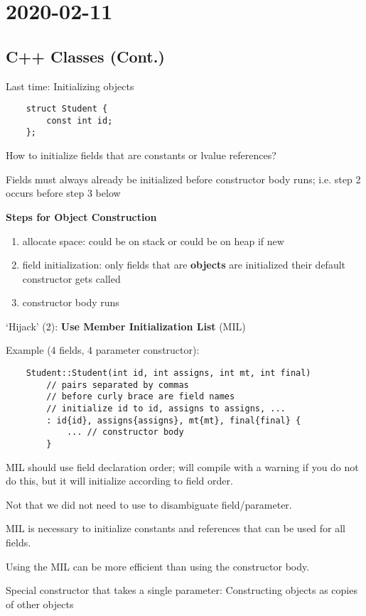 \section{2020-02-11}
\subsection{C++ Classes (Cont.)}
Last time: Initializing objects

\begin{lstlisting}
    struct Student {
        const int id;
    };
\end{lstlisting}
How to initialize fields that are constants or lvalue references?

Fields must always already be initialized before constructor body runs;
i.e. step 2 occurs before step 3 below

\textbf{Steps for Object Construction}
\begin{enumerate}[(1)]
    \item allocate space: could be on stack or could be on heap if new
    \item field initialization: only fields that are \textbf{objects} are initialized
    \subitem their default constructor gets called
    \item constructor body runs
\end{enumerate}
`Hijack' (2): \textbf{Use Member Initialization List} (MIL)

Example (4 fields, 4 parameter constructor):
\begin{lstlisting}
    Student::Student(int id, int assigns, int mt, int final)
        // pairs separated by commas
        // before curly brace are field names
        // initialize id to id, assigns to assigns, ...
        : id{id}, assigns{assigns}, mt{mt}, final{final} {
            ... // constructor body
        }
\end{lstlisting}
MIL should use field declaration order; will compile with a warning if you do not
do this, but it will initialize according to field order.

Not that we did not need to use  to disambiguate field/parameter.

MIL is necessary to initialize constants and references that can be used for
all fields.

Using the MIL can be more efficient than using the constructor body.

Special constructor that takes a single parameter: Constructing objects
as copies of other objects

